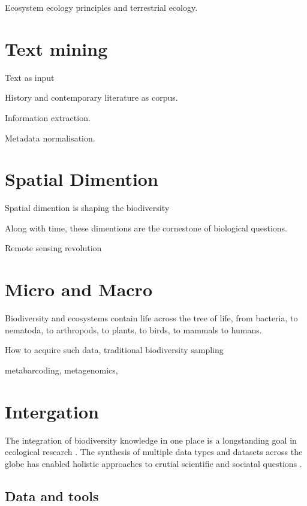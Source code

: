Ecosystem ecology principles \citep{Chapin_Matson_Vitousek_2011} and terrestrial
ecology. 

\section{Text mining}
\label{sec:text-mining}

Text as input

History and contemporary literature as corpus. 

Information extraction. 

Metadata normalisation.



\section{Spatial Dimention}
\label{sec:crete-spatial}

Spatial dimention is shaping the biodiversity

Along with time, these dimentions are the cornestone of 
biological questions. 


Remote sensing revolution

\section{Micro and Macro}
\label{sec:crete-micro-macro}

Biodiversity and ecosystems contain life across the tree of life, from
bacteria, to nematoda, to arthropods, to plants, to birds, to mammals to 
humans. 

How to acquire such data, traditional biodiversity sampling 

metabarcoding, 
metagenomics,

\section{Intergation}
\label{sec:crete-integration}

The integration of biodiversity knowledge in one place is a longstanding
goal in ecological research \citep{Walter_2012}. The synthesis of multiple
data types and datasets across the globe has enabled 
holistic approaches to crutial scientific and sociatal questions \citep{heberling_j_mason_data_2021}.

\subsection{Data and tools}
\label{sec:data-tools}

